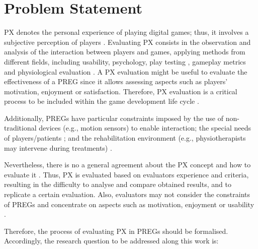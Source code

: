 \section{Problem Statement}


\ac{PX} denotes the personal experience of playing digital games; thus, it involves a subjective perception of players \autocite{Wiemeyer2016,Chu2011}. Evaluating \ac{PX} consists in the observation and analysis of the interaction between players and games, applying methods from different fields, including usability, psychology, play testing \autocite{Wiemeyer2016}, gameplay metrics \autocite{Drachen2013} and physiological evaluation \autocite{Nacke2015}. A \ac{PX} evaluation might be useful to evaluate the effectiveness of a \ac{PREG} since it allows assessing aspects such as players' motivation, enjoyment or satisfaction. Therefore, \ac{PX} evaluation is a critical process to be included within the game development life cycle \autocite{Bernhaupt2015,McAllister2015,desurvire_methods_2013,Nacke2009}.

Additionally, \acp{PREG} have particular constraints imposed by the use of non-traditional devices (e.g., motion sensors) to enable interaction; the special needs of players/patients \autocite{Pirovano2016,Wiemeyer2015,Sinclair2007,Ni2014,Cameirao2010,Nijholt2008}; and the rehabilitation environment (e.g., physiotherapists may intervene during treatments) \autocite{Wiemeyer2015,Nijholt2008}. 

Nevertheless, there is no a general agreement about the \ac{PX} concept and how to evaluate it \autocite{Yanez-Gomez2017,Wiemeyer2016,Mueller2015}. Thus, \ac{PX} is evaluated based on evaluators experience and criteria, resulting in the difficulty to analyse and compare obtained results, and to replicate a certain evaluation. Also, evaluators may not consider the constraints of \acp{PREG} and concentrate on aspects such as motivation, enjoyment or usability \autocite{Brokaw2015,Ni2014,Cameirao2010,jansen2013serious}.

Therefore, the process of evaluating \ac{PX} in \acp{PREG} should be formalised. Accordingly, the research question to be addressed along this work is:

